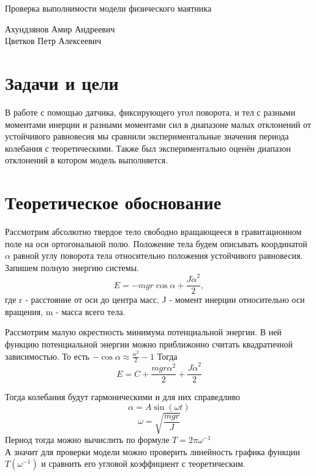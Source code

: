 \documentclass[12pt,a4paper]{scrartcl}
\begin{document}
\begin{center}
\begin{large}
Проверка выполнимости модели физического маятника
\end{large}
	\bigskip
     
Ахундзянов Амир Андреевич \\
Цветков Петр Алексеевич 
\end{center}

\section{Задачи и цели}
	В работе с помощью датчика, фиксирующего угол поворота, и тел с разными моментами инерции и разными моментами сил в диапазоне малых отклонений от устойчивого равновесия мы сравнили экспериментальные значения периода колебания с теоретическими. Также был экспериментально оценён диапазон отклонений в котором модель выполняется.

\section{Теоретическое обоснование}
	Рассмотрим абсолютно твердое тело свободно вращающееся в гравитационном поле на оси ортогональной полю. Положение тела будем описывать координатой $\alpha$ равной углу поворота тела относительно положения устойчивого равновесия. Запишем полную энергию системы.
\begin{displaymath}
E = -mgr\cos\alpha + \frac{J\dot{\alpha}^2}{2},
\end{displaymath}
где r - расстояние от оси до центра масс, J - момент инерции относительно оси вращения, m - масса всего тела.

Рассмотрим малую окрестность минимума потенциальной энергии. В ней функцию потенциальной энергии можно приближонно считать квадратичной зависимостью. То есть $-\cos\alpha \approx \frac{\alpha^2}{2} - 1 $
Тогда \begin{displaymath}
E = C + \frac{mgr\alpha^2}{2} + \frac{J\dot{\alpha}^2}{2}
\end{displaymath}

Тогда колебания будут гармоническими и для них справедливо
\begin{displaymath}
\alpha = A\sin(\omega t) 
\end{displaymath}
\begin{displaymath}
\omega = \sqrt{\frac{mgr}{J}}
\end{displaymath}
Период тогда можно вычислить по формуле $T = 2\pi\omega^{-1}$\\
А значит для проверки модели можно проверить линейность графика функции $T(\omega^{-1})$ и сравнить его угловой коэффициент с теоретическим.
\end{document}
